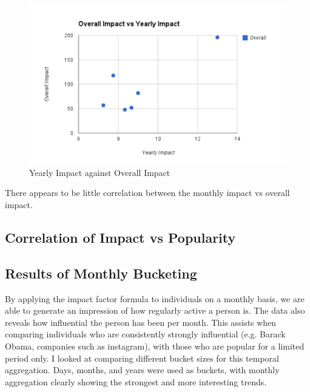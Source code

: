 \begin{figure}[h!]
\centering
\includegraphics{Images/yearly_impact_vs_overall_impact.pdf}
\caption{Yearly Impact against Overall Impact}
\end{figure}

There appears to be little correlation between the monthly impact vs overall impact.\\

\subsection{Correlation of Impact vs Popularity}

\subsection{Results of Monthly Bucketing}

By applying the impact factor formula to individuals on a monthly basis, we are able to generate an impression of how regularly active a person is. The data also reveals how influential the person has been per month. This assists when comparing individuals who are consistently strongly influential (e.g. Barack Obama, companies such as instagram), with those who are popular for a limited period only. I looked at comparing different bucket sizes for this temporal aggregation. Days, months, and years were used as buckets, with monthly aggregation clearly showing the strongest and more interesting trends. 

